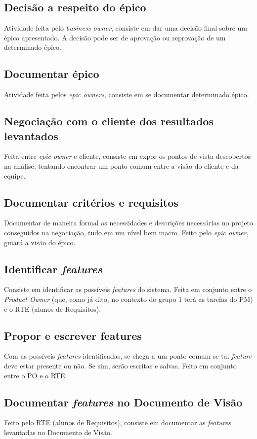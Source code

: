 \subsection{Decisão a respeito do épico}
Atividade feita pelo \emph{business owner}, consiste em dar uma decisão final sobre um épico apresentado. A decisão pode ser de aprovação ou reprovação de um determinado épico.

\subsection{Documentar épico}
Atividade feita pelos \emph{epic owners}, consiste em se documentar determinado épico.

\subsection{Negociação com o cliente dos resultados levantados}
Feita entre \emph{epic owner} e cliente, consiste em expor os pontos de vista descobertos na análise, tentando encontrar um ponto comum entre a visão do cliente e da equipe.

\subsection{Documentar critérios e requisitos}
Documentar de maneira formal as necessidades e descrições necessárias no projeto conseguidos na negociação, tudo em um nível bem macro. Feito pelo \emph{epic owner}, guiará a visão do épico.

\subsection{Identificar \emph{features}}
Consiste em identificar as possíveis \emph{features} do sistema. Feita em conjunto entre o \emph{Product Owner} (que, como já dito, no contexto do grupo 1 terá as tarefas do PM) e o RTE (alunos de Requisitos).

\subsection{Propor e escrever features}
Com as possíveis \emph{features} identificadas, se chega a um ponto comum se tal \emph{feature} deve estar presente ou não. Se sim, serão escritas e salvas. Feito em conjunto entre o PO e o RTE.

\subsection{Documentar \emph{features} no Documento de Visão}
Feito pelo RTE (alunos de Requisitos), consiste em documentar as \emph{features} levantadas no Documento de Visão.

